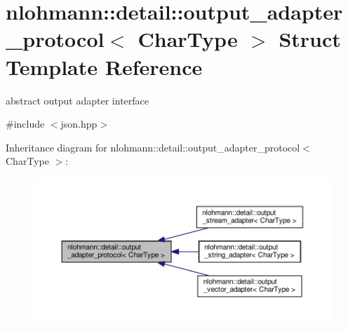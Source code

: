 \hypertarget{structnlohmann_1_1detail_1_1output__adapter__protocol}{}\section{nlohmann\+:\+:detail\+:\+:output\+\_\+adapter\+\_\+protocol$<$ Char\+Type $>$ Struct Template Reference}
\label{structnlohmann_1_1detail_1_1output__adapter__protocol}


abstract output adapter interface  




{\ttfamily \#include $<$json.\+hpp$>$}



Inheritance diagram for nlohmann\+:\+:detail\+:\+:output\+\_\+adapter\+\_\+protocol$<$ Char\+Type $>$\+:
\nopagebreak
\begin{figure}[H]
\begin{center}
\leavevmode
\includegraphics[width=350pt]{structnlohmann_1_1detail_1_1output__adapter__protocol__inherit__graph}
\end{center}
\end{figure}
